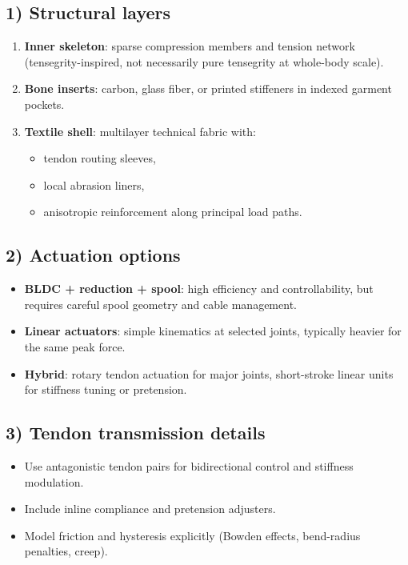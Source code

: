 \documentclass[11pt]{article}
\begin{document}
\subsection*{1) Structural layers}
\begin{enumerate}[leftmargin=*]
  \item \textbf{Inner skeleton}: sparse compression members and tension network (tensegrity-inspired, not necessarily pure tensegrity at whole-body scale).
  \item \textbf{Bone inserts}: carbon, glass fiber, or printed stiffeners in indexed garment pockets.
  \item \textbf{Textile shell}: multilayer technical fabric with:
  \begin{itemize}[leftmargin=*]
    \item tendon routing sleeves,
    \item local abrasion liners,
    \item anisotropic reinforcement along principal load paths.
  \end{itemize}
\end{enumerate}

\subsection*{2) Actuation options}
\begin{itemize}[leftmargin=*]
  \item \textbf{BLDC + reduction + spool}:
  high efficiency and controllability, but requires careful spool geometry and cable management.
  \item \textbf{Linear actuators}:
  simple kinematics at selected joints, typically heavier for the same peak force.
  \item \textbf{Hybrid}:
  rotary tendon actuation for major joints, short-stroke linear units for stiffness tuning or pretension.
\end{itemize}

\subsection*{3) Tendon transmission details}
\begin{itemize}[leftmargin=*]
  \item Use antagonistic tendon pairs for bidirectional control and stiffness modulation.
  \item Include inline compliance and pretension adjusters.
  \item Model friction and hysteresis explicitly (Bowden effects, bend-radius penalties, creep).
\end{itemize}
\end{document}
